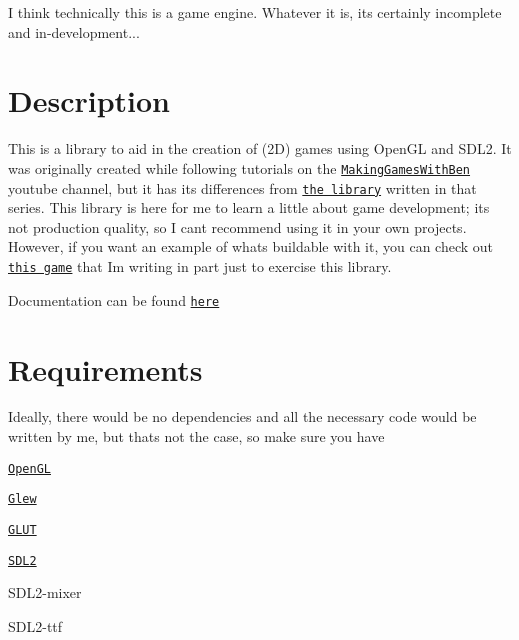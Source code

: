 I think technically this is a game engine. Whatever it is, it\textquotesingle{}s certainly incomplete and in-\/development...

\section*{Description}

This is a library to aid in the creation of (2D) games using Open\+GL and S\+D\+L2. It was originally created while following tutorials on the \href{https://www.youtube.com/channel/UCL5m1_llmeiAdZMo_ZanIvg}{\tt Making\+Games\+With\+Ben} youtube channel, but it has its differences from \href{https://github.com/Barnold1953/GraphicsTutorials}{\tt the library} written in that series. This library is here for me to learn a little about game development; it\textquotesingle{}s not production quality, so I can\textquotesingle{}t recommend using it in your own projects. However, if you want an example of what\textquotesingle{}s buildable with it, you can check out \href{https://github.com/NivenT/Planet}{\tt this game} that I\textquotesingle{}m writing in part just to exercise this library.

Documentation can be found \href{https://nivent.github.io/jubilant-funicular/html/index.html}{\tt here}

\section*{Requirements}

Ideally, there would be no dependencies and all the necessary code would be written by me, but that\textquotesingle{}s not the case, so make sure you have


\begin{DoxyItemize}
\item \href{https://www.opengl.org/}{\tt Open\+GL}
\begin{DoxyItemize}
\item \href{http://glew.sourceforge.net/}{\tt Glew}
\item \href{http://freeglut.sourceforge.net/}{\tt G\+L\+UT}
\end{DoxyItemize}
\item \href{https://www.libsdl.org/download-2.0.php}{\tt S\+D\+L2}
\begin{DoxyItemize}
\item S\+D\+L2-\/mixer
\item S\+D\+L2-\/ttf
\end{DoxyItemize}
\end{DoxyItemize}


